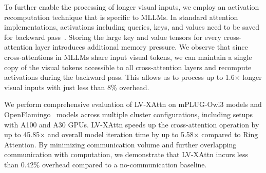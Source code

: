 To further enable the processing of longer visual inputs, we employ an activation recomputation technique that is specific to MLLMs. In standard attention implementations, activations including queries, keys, and values need to be saved for backward pass~\cite{korthikanti2023reducing}. Storing the large key and value tensors for every cross-attention layer introduces additional memory pressure. We observe that since cross-attentions in MLLMs share input visual tokens, we can maintain a single copy of the visual tokens accessible to all cross-attention layers and recompute activations during the backward pass. This allows us to process up to 1.6$\times$ longer visual inputs with just less than 8\% overhead.

We perform comprehensive evaluation of LV-XAttn on mPLUG-Owl3 models and OpenFlamingo~\cite{awadalla2023openflamingo} models across multiple cluster configurations, including setups with A100 and A30 GPUs. LV-XAttn speeds up the cross-attention operation by up to 45.85$\times$ and overall model iteration time by up to 5.58$\times$ compared to Ring Attention. By minimizing communication volume and further overlapping communication with computation, we demonstrate that LV-XAttn incurs less than 0.42\% overhead compared to a no-communication baseline.






